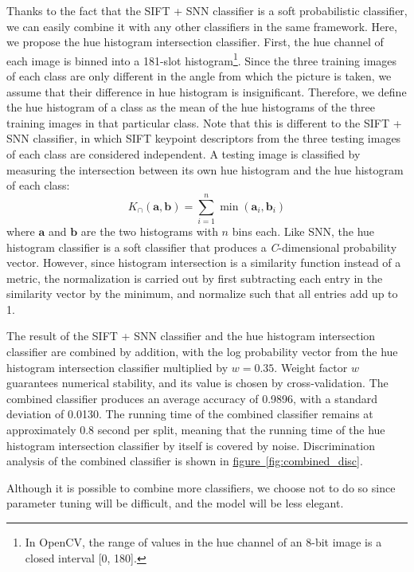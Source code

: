 \documentclass[11pt,a4paper]{article}
\begin{document}
Thanks to the fact that the SIFT + SNN classifier is a soft probabilistic classifier, we can easily combine it with any other classifiers in the same framework. Here, we propose the hue histogram intersection classifier. First, the hue channel of each image is binned into a 181-slot histogram\footnote{In OpenCV, the range of values in the hue channel of an 8-bit image is a closed interval [0, 180].}. Since the three training images of each class are only different in the angle from which the picture is taken, we assume that their difference in hue histogram is insignificant. Therefore, we define the hue histogram of a class as the mean of the hue histograms of the three training images in that particular class. Note that this is different to the SIFT + SNN classifier, in which SIFT keypoint descriptors from the three testing images of each class are considered independent. A testing image is classified by measuring the intersection between its own hue histogram and the hue histogram of each class:
\[K_{\cap}(\mathbf{a},\mathbf{b})=\sum_{i=1}^n\operatorname{min}(\mathbf{a}_i,\mathbf{b}_i)\]
where $\mathbf{a}$ and $\mathbf{b}$ are the two histograms with $n$ bins each. Like SNN, the hue histogram classifier is a soft classifier that produces a \emph{C}-dimensional probability vector. However, since histogram intersection is a similarity function instead of a metric, the normalization is carried out by first subtracting each entry in the similarity vector by the minimum, and normalize such that all entries add up to 1.

The result of the SIFT + SNN classifier and the hue histogram intersection classifier are combined by addition, with the log probability vector from the hue histogram intersection classifier multiplied by $w=0.35.$ Weight factor $w$ guarantees numerical stability, and its value is chosen by cross-validation. The combined classifier produces an average accuracy of 0.9896, with a standard deviation of 0.0130. The running time of the combined classifier remains at approximately 0.8 second per split, meaning that the running time of the hue histogram intersection classifier by itself is covered by noise. Discrimination analysis of the combined classifier is shown in \hyperref[fig:combined_disc]{figure~\ref{fig:combined_disc}}.

Although it is possible to combine more classifiers, we choose not to do so since parameter tuning will be difficult, and the model will be less elegant.
\end{document}
